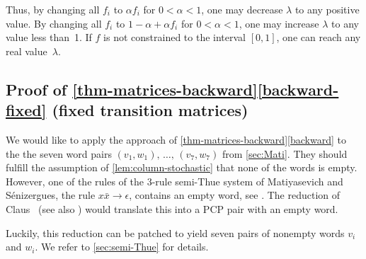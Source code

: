 \documentclass[a4paper,cleveref, autoref, thm-restate]{lipics-v2021}
\newcommand\clausEATCS{claus80-Bull-EATCS-anonymous}
\newcommand\clausEATCS{claus80-Bull-EATCS}
\begin{document}
Thus, by changing all $f_i$ to $\alpha f_i$ for $0<\alpha<1$, one may
decrease $\lambda$ to any positive value.
 By changing all $f_i$ to $1-\alpha +\alpha f_i$ for $0<\alpha<1$, one may
 increase $\lambda$ to any value less than~1.
If $f$ is not constrained to the interval $[0,1]$, one can reach any
real value~$\lambda$. 

 
 \subsection{Proof of
   \autoref{thm-matrices-backward}\ref{backward-fixed} (fixed
  transition matrices)}
\label{sec:back-fixed}



We would like to apply the approach of
\autoref{thm-matrices-backward}\ref{backward}
to the the seven word pairs
 $(v_1,w_1),\,\allowbreak\ldots, %
 \,(v_7,w_7)$
from
\autoref{sec:Mati}.
They should fulfill the assumption of
\autoref{lem:column-stochastic} that none of the words is empty.
However, one of the rules of the
3-rule semi-Thue system of
Matiyasevich and S{\'e}nizergues,
the rule $x\bar x\longrightarrow \epsilon$,
contains
an empty word,
see \cite[System~$S_5$, (23)]{matiyasevich2005decision}.
 The reduction of 
Claus
\cite{\clausEATCS}\ 
(see also
\cite[Theorem~4]{halava07-Claus-instances})
would translate this into a PCP pair with an empty word.

Luckily, this reduction can be patched
to yield seven pairs of nonempty words $v_i$ and $w_i$.
We refer to
\autoref{sec:semi-Thue} for details.
\end{document}
